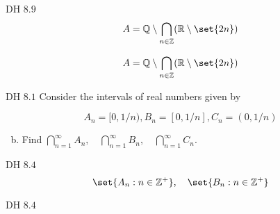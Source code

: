 \begin{frame}{}
  \begin{exampleblock}{DH $8.9$}
    \[
      A = \mathbb{Q} \setminus \bigcap_{n \in \mathbb{Z}} (\mathbb{R} \setminus \set{2n})
    \]
  \end{exampleblock}

  \pause
  \begin{align*}
     A &= \mathbb{Q} \setminus \bigcap_{n \in \mathbb{Z}} (\mathbb{R} \setminus \set{2n}) \\
  \end{align*}
\end{frame}

\begin{frame}{}
  \begin{exampleblock}{DH $8.1$}
    Consider the intervals of real numbers given by 

    \[
      A_n = [0, 1/n), B_n = [0, 1/n], C_n = (0, 1/n)
    \]

    \begin{enumerate}[(a)]
      \setcounter{enumi}{1}
      \item Find $\bigcap_{n=1}^{\infty} A_n, \quad \bigcap_{n=1}^{\infty} B_n, \quad \bigcap_{n=1}^{\infty} C_n$.
    \end{enumerate}
  \end{exampleblock}

  \pause
  \vspace{0.50cm}
  \begin{exampleblock}{DH $8.4$}
    \[
      \set{A_n: n \in \mathbb{Z}^{+}}, \quad \set{B_n: n \in \mathbb{Z}^{+}}
    \]
  \end{exampleblock}
\end{frame}

\begin{frame}{}
  \begin{exampleblock}{DH $8.4$}
  \end{exampleblock}
\end{frame}

